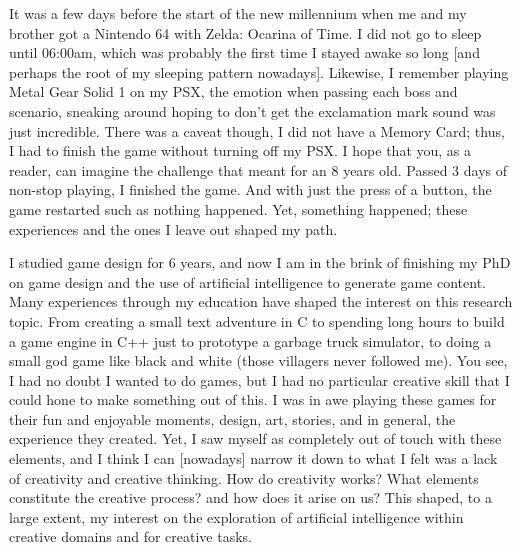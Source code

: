 

It was a few days before the start of the new millennium when me and my brother got a Nintendo 64 with Zelda: Ocarina of Time. I did not go to sleep until 06:00am, which was probably the first time I stayed awake so long [and perhaps the root of my sleeping pattern nowadays]. Likewise, I remember playing Metal Gear Solid 1 on my PSX, the emotion when passing each boss and scenario, sneaking around hoping to don't get the exclamation mark sound was just incredible. There was a caveat though, I did not have a Memory Card; thus, I had to finish the game without turning off my PSX. I hope that you, as a reader, can imagine the challenge that meant for an 8 years old. Passed 3 days of non-stop playing, I finished the game. And with just the press of a button, the game restarted such as nothing happened. Yet, something happened; these experiences and the ones I leave out shaped my path. 

I studied game design for 6 years, and now I am in the brink of finishing my PhD on game design and the use of artificial intelligence to generate game content. Many experiences through my education have shaped the interest on this research topic. From creating a small text adventure in C to spending long hours to build a game engine in C++ just to prototype a garbage truck simulator, to doing a small god game like black and white (those villagers never followed me). You see, I had no doubt I wanted to do games, but I had no particular creative skill that I could hone to make something out of this. I was in awe playing these games for their fun and enjoyable moments, design, art, stories, and in general, the experience they created. Yet, I saw myself as completely out of touch with these elements, and I think I can [nowadays] narrow it down to what I felt was a lack of creativity and creative thinking. How do creativity works? What elements constitute the creative process? and how does it arise on us? This shaped, to a large extent, my interest on the exploration of artificial intelligence within creative domains and for creative tasks.

